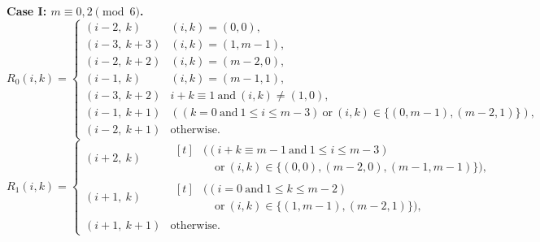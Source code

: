 \documentclass[11pt]{article}
\begin{document}
\medskip
\noindent\textbf{Case I: $m\equiv 0,2\pmod 6$.}
\[
R_0(i,k)=
\begin{cases}
(i-2,\ k) & (i,k)=(0,0),\\
(i-3,\ k+3) & (i,k)=(1,m-1),\\
(i-2,\ k+2) & (i,k)=(m-2,0),\\
(i-1,\ k) & (i,k)=(m-1,1),\\
(i-3,\ k+2) & i+k\equiv 1\ \text{and}\ (i,k)\neq (1,0),\\
(i-1,\ k+1) & ((k=0\ \text{and}\ 1\le i\le m-3)\ \text{or}\ (i,k)\in\{(0,m-1),(m-2,1)\}),\\
(i-2,\ k+1) & \text{otherwise.}
\end{cases}
\]
\[
R_1(i,k)=
\begin{cases}
(i+2,\ k) & \begin{aligned}[t]
            &\bigl( (i+k\equiv m-1\ \text{and}\ 1\le i\le m-3)\\
            &\quad\text{or}\ (i,k)\in\{(0,0),(m-2,0),(m-1,m-1)\} \bigr),
            \end{aligned}\\[2.5ex]
(i+1,\ k) & \begin{aligned}[t]
            &\bigl( (i=0\ \text{and}\ 1\le k\le m-2)\\
            &\quad\text{or}\ (i,k)\in\{(1,m-1),(m-2,1)\} \bigr),
            \end{aligned}\\[2.5ex]
(i+1,\ k+1) & \text{otherwise.}
\end{cases}
\]
\end{document}
